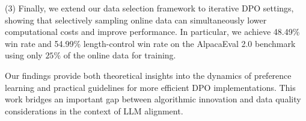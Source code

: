 (3) Finally, we extend our data selection framework to iterative DPO settings, showing that selectively sampling online data can simultaneously lower computational costs and improve performance. In particular, we achieve 48.49\% win rate and 54.99\% length-control win rate on the AlpacaEval 2.0 benchmark using only $25\%$ of the online data for training.


Our findings provide both theoretical insights into the dynamics of preference learning and practical guidelines for more efficient DPO implementations. This work bridges an important gap between algorithmic innovation and data quality considerations in the context of LLM alignment.